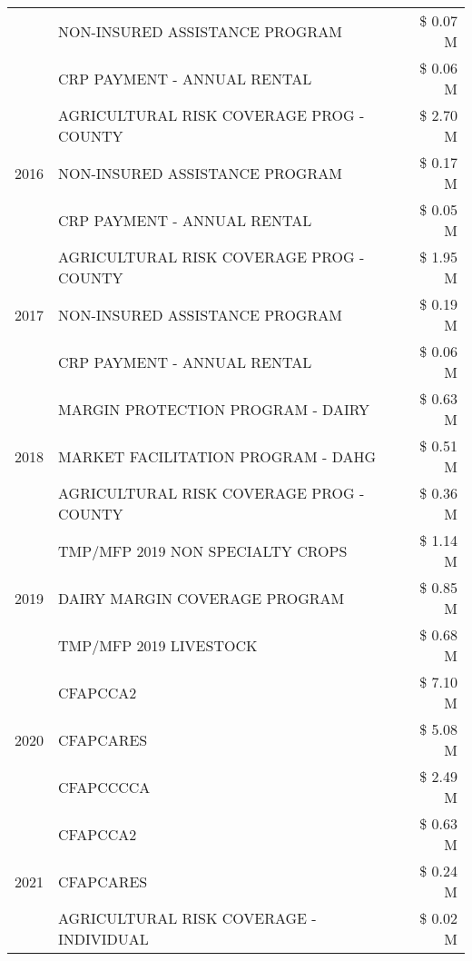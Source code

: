 \begin{tabular}{llr}
 & NON-INSURED ASSISTANCE PROGRAM & \$ 0.07 M \\
 & CRP PAYMENT - ANNUAL RENTAL & \$ 0.06 M \\
\cline{1-3}
\multirow[t]{3}{*}{2016} & AGRICULTURAL RISK COVERAGE PROG - COUNTY & \$ 2.70 M \\
 & NON-INSURED ASSISTANCE PROGRAM & \$ 0.17 M \\
 & CRP PAYMENT - ANNUAL RENTAL & \$ 0.05 M \\
\cline{1-3}
\multirow[t]{3}{*}{2017} & AGRICULTURAL RISK COVERAGE PROG - COUNTY & \$ 1.95 M \\
 & NON-INSURED ASSISTANCE PROGRAM & \$ 0.19 M \\
 & CRP PAYMENT - ANNUAL RENTAL & \$ 0.06 M \\
\cline{1-3}
\multirow[t]{3}{*}{2018} & MARGIN PROTECTION PROGRAM - DAIRY & \$ 0.63 M \\
 & MARKET FACILITATION PROGRAM - DAHG & \$ 0.51 M \\
 & AGRICULTURAL RISK COVERAGE PROG - COUNTY & \$ 0.36 M \\
\cline{1-3}
\multirow[t]{3}{*}{2019} & TMP/MFP 2019 NON SPECIALTY CROPS & \$ 1.14 M \\
 & DAIRY MARGIN COVERAGE PROGRAM & \$ 0.85 M \\
 & TMP/MFP 2019 LIVESTOCK & \$ 0.68 M \\
\cline{1-3}
\multirow[t]{3}{*}{2020} & CFAPCCA2 & \$ 7.10 M \\
 & CFAPCARES & \$ 5.08 M \\
 & CFAPCCCCA & \$ 2.49 M \\
\cline{1-3}
\multirow[t]{3}{*}{2021} & CFAPCCA2 & \$ 0.63 M \\
 & CFAPCARES & \$ 0.24 M \\
 & AGRICULTURAL RISK COVERAGE - INDIVIDUAL & \$ 0.02 M \\
\cline{1-3}
\bottomrule
\end{tabular}
